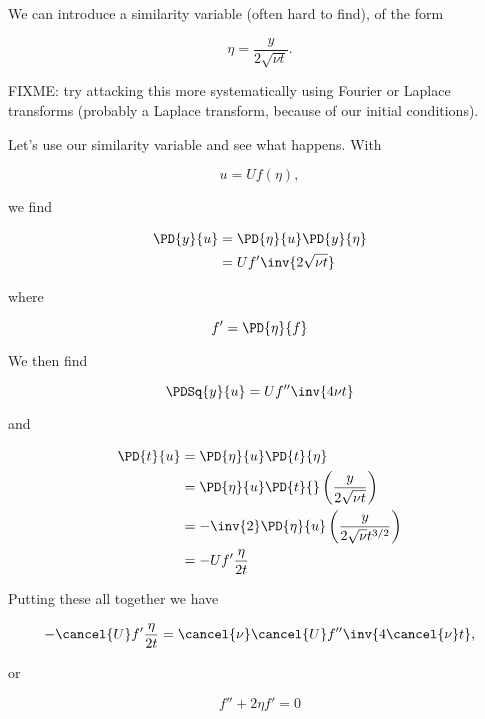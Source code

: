 We can introduce a similarity variable (often hard to find), of the form

\begin{equation}\label{eqn:continuumL16:390}
\eta = \frac{y}{2 \sqrt{\nu t}}.
\end{equation}

FIXME: try attacking this more systematically using Fourier or Laplace transforms (probably a Laplace transform, because of our initial conditions).

Let's use our similarity variable and see what happens.  With

\begin{equation}\label{eqn:continuumL16:410}
u = U f(\eta),
\end{equation}

we find

\begin{align*}
\PD{y}{u} 
&= \PD{\eta}{u} \PD{y}{\eta} \\
&= U f' \inv{2 \sqrt{\nu t}}
\end{align*}

where 

\begin{equation}\label{eqn:continuumL16:430}
f' = \PD{\eta}{f}
\end{equation}

We then find

\begin{equation}\label{eqn:continuumL16:450}
\PDSq{y}{u} = U f'' \inv{4 \nu t}
\end{equation}

and

\begin{align*}
\PD{t}{u} 
&= \PD{\eta}{u} \PD{t}{\eta} \\
&= \PD{\eta}{u} \PD{t}{}\left(
\frac{y}{2 \sqrt{\nu t}}
\right) \\
&= -\inv{2} \PD{\eta}{u} \left(
\frac{y}{2 \sqrt{\nu} t^{3/2}}
\right) \\
&= - U f' \frac{\eta}{2 t}
\end{align*}

Putting these all together we have

\begin{equation}\label{eqn:continuumL16:630}
- \cancel{U} f' \frac{\eta}{2 t} = \cancel{\nu} \cancel{U} f'' \inv{4 \cancel{\nu} t},
\end{equation}

or

\begin{equation}\label{eqn:continuumL16:490}
f'' + 2 \eta f' = 0
\end{equation}

